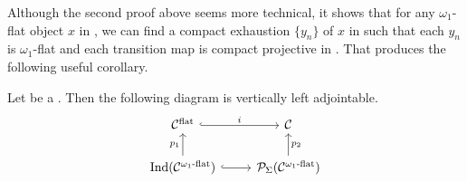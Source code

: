 \documentclass[a4paper,10pt, oneside]{amsart}
\begin{document}
	\begin{rem}\label{compexhaus}
		Although the second proof above seems more technical, it shows that for any $\omega_1$-flat object $x$ in \mcc, we can find a compact exhaustion $\{y_n\}$ of $x$ in \cflat such that each $y_n$ is $\omega_1$-flat and each transition map is compact projective in \mcc. That produces the following useful corollary.
	\end{rem}
	
	\begin{cor}\label{leftadjtable}
		Let \mcc be a \dualaddinfcat. Then the following diagram is vertically left adjointable. 
		$$%
		\begin{tikzcd}
			\mathcal{C}^{\op{flat}} \arrow[r,hook, "i"]                                                            & \mcc                                             \\
			\mathrm{Ind}(\mathcal{C}^{\omega_1\text{-}{\op{flat}}}) \arrow[u, "p_{1}"] \arrow[r,hook, ""'] & \mcp_\Sigma(\mathcal{C}^{\omega_1\text{-}{\op{flat}}}) \arrow[u, "p_{2}"']
		\end{tikzcd}$$
	\end{cor}
	
\end{document}
